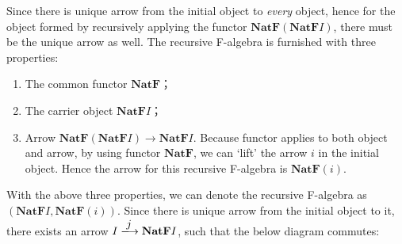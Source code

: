 \documentclass[b5paper]{article}
\begin{document}
\begin{center}
\end{center}

Since there is unique arrow from the initial object to {\em every} object, hence for the object formed by recursively applying the functor $\mathbf{NatF}(\mathbf{NatF}I)$, there must be the unique arrow as well. The recursive F-algebra is furnished with three properties:

\begin{enumerate}
\item The common functor $\mathbf{NatF}$；
\item The carrier object $\mathbf{NatF}I$；
\item Arrow $\mathbf{NatF}(\mathbf{NatF}I) \to \mathbf{NatF}I$. Because functor applies to both object and arrow, by using functor $\mathbf{NatF}$, we can `lift' the arrow $i$ in the initial object. Hence the arrow for this recursive F-algebra is $\mathbf{NatF}(i)$.
\end{enumerate}

With the above three properties, we can denote the recursive F-algebra as $(\mathbf{NatF}I, \mathbf{NatF}(i))$. Since there is unique arrow from the initial object to it, there exists an arrow $I \arrowto{j} \mathbf{NatF}I$, such that the below diagram commutes:

\begin{center}
\end{center}
\end{document}
